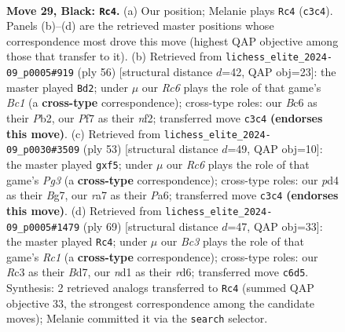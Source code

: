 \documentclass[11pt]{article}
\begin{document}
\clearpage

\begin{figure}[p]\centering
\begin{subfigure}{0.46\textwidth}\centering
\resizebox{\linewidth}{!}{%
\newchessgame
\chessboard[
  setfen={6k1/R4pp1/2b1p3/1p5p/1P1PnP1P/2r3P1/4P3/3N1BK1 b - - 2 29},
  showmover=false,
  pgfstyle=straightmove, color=movearrow, markmove={c3-c4}
]}
\caption{}
\end{subfigure}\hfill
\begin{subfigure}{0.46\textwidth}\centering
\resizebox{\linewidth}{!}{%
\newchessgame
\chessboard[
  setfen={6k1/bpp2p2/p6p/P2P2p1/2r5/1R3N2/1P3nPP/2B2K2 w - - 0 29},
  showmover=false,
  pgfstyle=straightmove, color=movearrow, markmove={c1-d2}
]}
\caption{}
\end{subfigure}
\\[4pt]
\begin{subfigure}{0.46\textwidth}\centering
\resizebox{\linewidth}{!}{%
\newchessgame
\chessboard[
  setfen={6k1/6b1/p2r2p1/1p2pP2/2p5/2P2P2/PP4P1/3BK2R b - - 0 27},
  showmover=false,
  pgfstyle=straightmove, color=movearrow, markmove={g6-f5}
]}
\caption{}
\end{subfigure}\hfill
\begin{subfigure}{0.46\textwidth}\centering
\resizebox{\linewidth}{!}{%
\newchessgame
\chessboard[
  setfen={2r3k1/3b1p1p/1p1Rp3/1P2n1p1/P3P3/5P2/4N1PP/6K1 b - - 4 35},
  showmover=false,
  pgfstyle=straightmove, color=movearrow, markmove={c8-c4}
]}
\caption{}
\end{subfigure}
\caption{\textbf{Move 29, Black: \texttt{Rc4}.} (a) Our position; Melanie plays \texttt{Rc4} (\texttt{c3c4}). Panels (b)--(d) are the retrieved master positions whose correspondence most drove this move (highest QAP objective among those that transfer to it). (b) Retrieved from \texttt{lichess\_elite\_2024-09\_p0005\#919} (ply 56) [structural distance $d$=42, QAP obj=23]: the master played \texttt{Bd2}; under $\mu$ our \emph{Rc6} plays the role of that game's \emph{Bc1} (a \textbf{cross-type} correspondence); cross-type roles: our \emph{B}c6 as their \emph{P}b2, our \emph{P}f7 as their \emph{n}f2; transferred move \texttt{c3c4} \textbf{(endorses this move)}. (c) Retrieved from \texttt{lichess\_elite\_2024-09\_p0030\#3509} (ply 53) [structural distance $d$=49, QAP obj=10]: the master played \texttt{gxf5}; under $\mu$ our \emph{Rc6} plays the role of that game's \emph{Pg3} (a \textbf{cross-type} correspondence); cross-type roles: our \emph{p}d4 as their \emph{B}g7, our \emph{r}a7 as their \emph{P}a6; transferred move \texttt{c3c4} \textbf{(endorses this move)}. (d) Retrieved from \texttt{lichess\_elite\_2024-09\_p0005\#1479} (ply 69) [structural distance $d$=47, QAP obj=33]: the master played \texttt{Rc4}; under $\mu$ our \emph{Bc3} plays the role of that game's \emph{Rc1} (a \textbf{cross-type} correspondence); cross-type roles: our \emph{R}c3 as their \emph{B}d7, our \emph{n}d1 as their \emph{r}d6; transferred move \texttt{c6d5}. Synthesis: 2 retrieved analogs transferred to \texttt{Rc4} (summed QAP objective 33, the strongest correspondence among the candidate moves); Melanie committed it via the \texttt{search} selector.}
\label{fig:thought-m57}
\end{figure}
\end{document}
